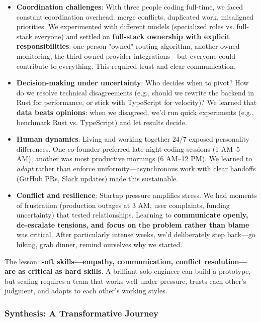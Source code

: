 \documentclass[english]{article}
\begin{document}
\begin{itemize}
    \item \textbf{Coordination challenges}: With three people coding full-time, we faced constant coordination overhead: merge conflicts, duplicated work, misaligned priorities. We experimented with different models (specialized roles vs. full-stack everyone) and settled on \textbf{full-stack ownership with explicit responsibilities}: one person "owned" routing algorithm, another owned monitoring, the third owned provider integrations—but everyone could contribute to everything. This required trust and clear communication.
    \item \textbf{Decision-making under uncertainty}: Who decides when to pivot? How do we resolve technical disagreements (e.g., should we rewrite the backend in Rust for performance, or stick with TypeScript for velocity)? We learned that \textbf{data beats opinions}: when we disagreed, we'd run quick experiments (e.g., benchmark Rust vs. TypeScript) and let results decide.
    \item \textbf{Human dynamics}: Living and working together 24/7 exposed personality differences. One co-founder preferred late-night coding sessions (1 AM–5 AM), another was most productive mornings (6 AM–12 PM). We learned to \emph{adapt} rather than enforce uniformity—asynchronous work with clear handoffs (GitHub PRs, Slack updates) made this sustainable.
    \item \textbf{Conflict and resilience}: Startup pressure amplifies stress. We had moments of frustration (production outages at 3 AM, user complaints, funding uncertainty) that tested relationships. Learning to \textbf{communicate openly, de-escalate tensions, and focus on the problem rather than blame} was critical. After particularly intense weeks, we'd deliberately step back—go hiking, grab dinner, remind ourselves why we started.
\end{itemize}

The lesson: \textbf{soft skills—empathy, communication, conflict resolution—are as critical as hard skills}. A brilliant solo engineer can build a prototype, but scaling requires a team that works well under pressure, trusts each other's judgment, and adapts to each other's working styles.

\subsubsection{Synthesis: A Transformative Journey}
\end{document}
